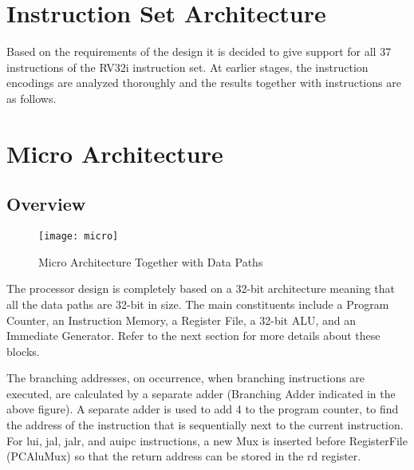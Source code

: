 \documentclass[12pt]{article}
\begin{document}
    \newpage


    \section{Instruction Set Architecture}
    Based on the requirements of the design it is decided to give support for all 37 instructions of the RV32i instruction set.
    At earlier stages, the instruction encodings are analyzed thoroughly and the results together with instructions are as follows.
    \begin{figure}[h]
        \label{fig:isa}
        \begin{center}
        \end{center}
    \end{figure}
    \newpage
    \section{Micro Architecture}
    \subsection{Overview}
    \begin{figure}[ht]
        \label{fig:pro}
        \begin{center}
            \texttt{[image: micro]}
        \end{center}
        \caption{Micro Architecture Together with Data Paths}
    \end{figure}

    The processor design is completely based on a 32-bit architecture meaning that all the data paths are 32-bit in size.
    The main constituents include a Program Counter, an Instruction Memory, a Register File, a 32-bit ALU, and an Immediate Generator.
    Refer to the next section for more details about these blocks.
    \par
    The branching addresses, on occurrence, when branching instructions are executed, are calculated by a separate adder (Branching Adder indicated in the above figure).
    A separate adder is used to add 4 to the program counter, to find the address of the instruction that is sequentially next to the current instruction.
    For lui, jal, jalr, and auipc instructions, a new Mux is inserted before RegisterFile (PCAluMux) so that the return address can be stored in the rd register.
\end{document}
